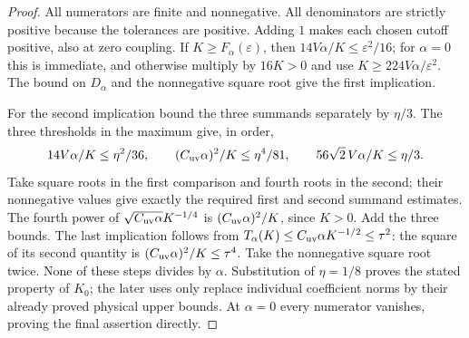 \documentclass[11pt,a4paper]{article}
\theoremstyle{definition}
\theoremstyle{remark}
\begin{document}
\begin{proof}
All numerators are finite and nonnegative. All denominators are
strictly positive because the tolerances are positive. Adding $1$
makes each chosen cutoff positive, also at zero coupling. If
$K\geq F_\alpha(\varepsilon)$, then
$14V\alpha/K\leq\varepsilon^2/16$; for $\alpha=0$ this is
immediate, and otherwise multiply by $16K>0$ and use
$K\geq224V\alpha/\varepsilon^2$. The bound on $D_\alpha$
and the nonnegative square root give the first implication.

For the second implication bound the three summands separately by
$\eta/3$. The three thresholds in the maximum give, in order,
\[
 14V\alpha/K\leq\eta^2/36,\qquad
 (C_{\rm uv}\alpha)^2/K\leq\eta^4/81,\qquad
 56\sqrt2\,V\alpha/K\leq\eta/3.
\]
Take square roots in the first comparison and fourth roots in the
second; their nonnegative values give exactly the required first
and second summand estimates. The fourth power of
$\sqrt{C_{\rm uv}\alpha}K^{-1/4}$ is
$(C_{\rm uv}\alpha)^2/K$, since $K>0$. Add the three bounds.
The last implication follows from
$T_\alpha(K)\leq C_{\rm uv}\alpha K^{-1/2}\leq\tau^2$:
the square of its second quantity is
$(C_{\rm uv}\alpha)^2/K\leq\tau^4$. Take the nonnegative
square root twice. None of these steps divides by $\alpha$.
Substitution of $\eta=1/8$ proves the stated property of $K_0$;
the later uses only replace individual coefficient norms by their
already proved physical upper bounds. At $\alpha=0$ every
numerator vanishes, proving the final assertion directly.
\end{proof}
\end{document}
